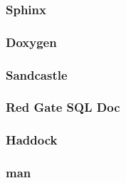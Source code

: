 \subsubsection{Sphinx}

\subsubsection{Doxygen}

\subsubsection{Sandcastle}

\subsubsection{Red Gate SQL Doc}

\subsubsection{Haddock}

\subsubsection{man}
